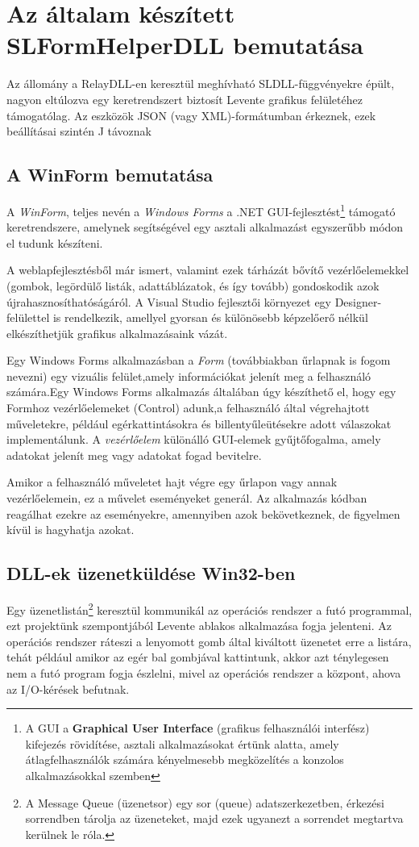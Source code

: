 \documentclass[tocnopagenum]{thesis-ekf}
\theoremstyle{definition}
\theoremstyle{remark}
\begin{document}
	\section{Az általam készített SLFormHelperDLL bemutatása}
	Az állomány a RelayDLL-en keresztül meghívható SLDLL-függvényekre épült, nagyon eltúlozva egy keretrendszert biztosít Levente grafikus felületéhez támogatólag. Az eszközök JSON (vagy XML)-formátumban érkeznek, ezek beállításai szintén J távoznak

	\subsection{A WinForm bemutatása}
	A \textit{WinForm}, teljes nevén a \textit{Windows Forms} a .NET GUI-fejlesztést\footnote{A GUI a \textbf{Graphical User Interface} (grafikus felhasználói interfész) kifejezés rövidítése, asztali alkalmazásokat értünk alatta, amely átlagfelhasználók számára kényelmesebb megközelítés a konzolos alkalmazásokkal szemben} támogató keretrendszere, amelynek segítségével egy asztali alkalmazást egyszerűbb módon el tudunk készíteni. 
	
	A weblapfejlesztésből már ismert, valamint ezek tárházát bővítő vezérlőelemekkel (gombok, legördülő listák, adattáblázatok, és így tovább) gondoskodik azok újrahasznosíthatóságáról. A Visual Studio fejlesztői környezet egy Designer-felülettel is rendelkezik, amellyel gyorsan és különösebb képzelőerő nélkül elkészíthetjük grafikus alkalmazásaink vázát.
	
	Egy Windows Forms alkalmazásban a \textit{Form} (továbbiakban űrlapnak is fogom nevezni) egy vizuális felület,amely információkat jelenít meg a felhasználó számára.Egy Windows Forms alkalmazás általában úgy készíthető el, hogy egy Formhoz vezérlőelemeket (Control) adunk,a felhasználó által végrehajtott műveletekre, például egérkattintásokra és billentyűleütésekre adott válaszokat implementálunk. A \textit{vezérlőelem} különálló GUI-elemek gyűjtőfogalma, amely adatokat jelenít meg vagy adatokat fogad bevitelre.
	
	Amikor a felhasználó műveletet hajt végre egy űrlapon vagy annak vezérlőelemein, ez a művelet eseményeket generál. Az alkalmazás kódban reagálhat ezekre az eseményekre, amennyiben azok bekövetkeznek, de figyelmen kívül is hagyhatja azokat.\cite{winform}
	\subsection{DLL-ek üzenetküldése Win32-ben}
	Egy üzenetlistán\footnote{A Message Queue (üzenetsor) egy sor (queue) adatszerkezetben, érkezési sorrendben tárolja az üzeneteket, majd ezek ugyanezt a sorrendet megtartva kerülnek le róla.} keresztül kommunikál az operációs rendszer a futó programmal, ezt projektünk szempontjából Levente ablakos alkalmazása fogja jelenteni. Az operációs rendszer ráteszi a lenyomott gomb által kiváltott üzenetet erre a listára, tehát például amikor az egér bal gombjával kattintunk, akkor azt ténylegesen nem a futó program fogja észlelni, mivel az operációs rendszer a központ, ahova az I/O-kérések befutnak. 
	
\end{document}
